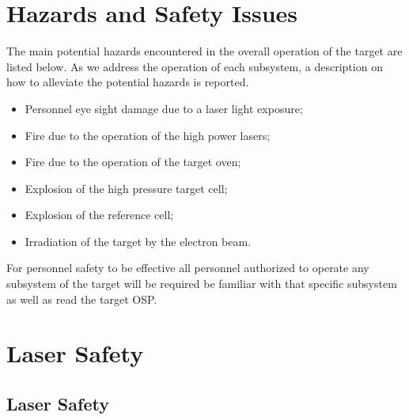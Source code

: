 \begin{safetyen}{10}{5}
\section{Hazards and Safety Issues}
\label{sec:haz}

The main potential hazards encountered in the overall operation of the
target are listed below.
As we address the operation of each subsystem, a description on how to
alleviate the potential
hazards is reported. 

\begin{itemize}

\item Personnel eye sight damage due to a laser light exposure;

\item Fire due to the operation of the high power lasers;

\item Fire due to the operation of the target oven;

\item Explosion of the high pressure target cell;

\item Explosion of the reference cell;

\item Irradiation of the target by the electron beam.
\end{itemize}

For personnel safety to be effective all personnel authorized to operate
any subsystem of the target will be
required  be familiar with that specific subsystem as well as read the
target OSP. 


\section{Laser Safety}
\label{sec:lsafe}

\subsection{Laser Safety}
\label{sec:lassaf}


\end{safetyen}
